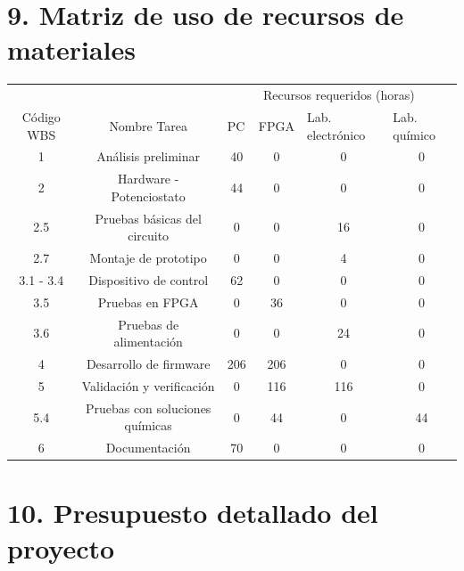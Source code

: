 \documentclass[11pt]{charter}
\begin{document}
\section{9. Matriz de uso de recursos de materiales}
\label{sec:recursos}

\begin{table}[H]
\label{tab:recursos}
\begin{tabular}{|c|c|c|c|c|c|}
\hline
\cellcolor[HTML]{C0C0C0} &
  \cellcolor[HTML]{C0C0C0} &
  \multicolumn{4}{c|}{\cellcolor[HTML]{C0C0C0}Recursos requeridos (horas)} \\ \cline{3-6} 
\multirow{-2}{*}{\cellcolor[HTML]{C0C0C0}Código WBS} &
  \multirow{-2}{*}{\cellcolor[HTML]{C0C0C0}Nombre Tarea} &
  \multicolumn{1}{l|}{PC} &
  \multicolumn{1}{l|}{FPGA} &
  \multicolumn{1}{l|}{Lab. electrónico} &
  \multicolumn{1}{l|}{Lab. químico} \\ \hline
1         & Análisis preliminar             & 40  & 0   & 0   & 0  \\ \hline
2         & Hardware - Potenciostato        & 44  & 0   & 0   & 0  \\ \hline
2.5       & Pruebas básicas del circuito    & 0   & 0   & 16  & 0  \\ \hline
2.7       & Montaje de prototipo            & 0   & 0   & 4   & 0  \\ \hline
3.1 - 3.4 & Dispositivo de control          & 62  & 0   & 0   & 0  \\ \hline
3.5       & Pruebas en FPGA                 & 0   & 36  & 0   & 0  \\ \hline
3.6       & Pruebas de alimentación         & 0   & 0   & 24  & 0  \\ \hline
4         & Desarrollo de firmware          & 206 & 206 & 0   & 0  \\ \hline
5         & Validación y verificación       & 0   & 116 & 116 & 0  \\ \hline
5.4       & Pruebas con soluciones químicas & 0   & 44  & 0   & 44 \\ \hline
6         & Documentación                   & 70  & 0   & 0   & 0  \\ \hline
\end{tabular}
\end{table}


\section{10. Presupuesto detallado del proyecto}
\label{sec:presupuesto}
\end{document}
